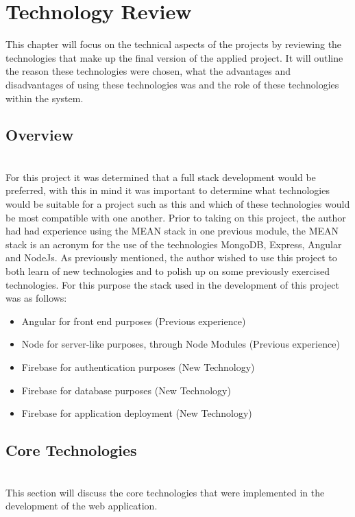 \chapter{Technology Review}
This chapter will focus on the technical aspects of the projects by reviewing the technologies that make up the final version of the applied project. It will outline the reason these technologies were chosen, what the advantages and disadvantages of using these technologies was and the role of these technologies within the system.

\section{Overview} \\
For this project it was determined that a full stack development would be preferred, with this in mind it was important to determine what technologies would be suitable for a project such as this and which of these technologies would be most compatible with one another. Prior to taking on this project, the author had had experience using the MEAN stack in one previous module, the MEAN stack is an acronym for the use of the technologies MongoDB, Express, Angular and NodeJs. As previously mentioned, the author wished to use this project to both learn of new technologies and to polish up on some previously exercised technologies. For this purpose the stack used in the development of this project was as follows: \\
\begin{itemize}
    \item Angular for front end purposes (Previous experience)
    \item Node for server-like purposes, through Node Modules (Previous experience)
    \item Firebase for authentication purposes (New Technology)
    \item Firebase for database purposes (New Technology)
    \item Firebase for application deployment (New Technology)
\end{itemize}

\section{Core Technologies} \\
This section will discuss the core technologies that were implemented in the development of the web application. \\ \\

